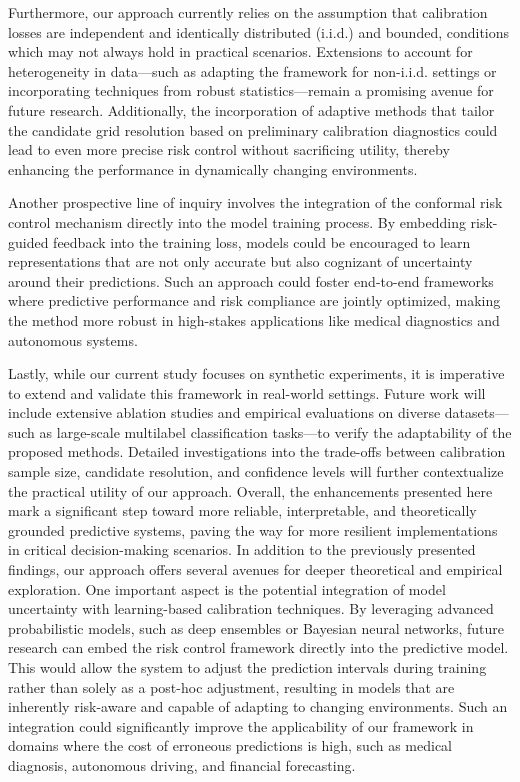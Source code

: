 \documentclass{article}
\begin{document}
Furthermore, our approach currently relies on the assumption that calibration losses are independent and identically distributed (i.i.d.) and bounded, conditions which may not always hold in practical scenarios. Extensions to account for heterogeneity in data—such as adapting the framework for non-i.i.d. settings or incorporating techniques from robust statistics—remain a promising avenue for future research. Additionally, the incorporation of adaptive methods that tailor the candidate grid resolution based on preliminary calibration diagnostics could lead to even more precise risk control without sacrificing utility, thereby enhancing the performance in dynamically changing environments.

Another prospective line of inquiry involves the integration of the conformal risk control mechanism directly into the model training process. By embedding risk-guided feedback into the training loss, models could be encouraged to learn representations that are not only accurate but also cognizant of uncertainty around their predictions. Such an approach could foster end-to-end frameworks where predictive performance and risk compliance are jointly optimized, making the method more robust in high-stakes applications like medical diagnostics and autonomous systems.

Lastly, while our current study focuses on synthetic experiments, it is imperative to extend and validate this framework in real-world settings. Future work will include extensive ablation studies and empirical evaluations on diverse datasets—such as large-scale multilabel classification tasks—to verify the adaptability of the proposed methods. Detailed investigations into the trade-offs between calibration sample size, candidate resolution, and confidence levels will further contextualize the practical utility of our approach. Overall, the enhancements presented here mark a significant step toward more reliable, interpretable, and theoretically grounded predictive systems, paving the way for more resilient implementations in critical decision-making scenarios.
In addition to the previously presented findings, our approach offers several avenues for deeper theoretical and empirical exploration. One important aspect is the potential integration of model uncertainty with learning-based calibration techniques. By leveraging advanced probabilistic models, such as deep ensembles or Bayesian neural networks, future research can embed the risk control framework directly into the predictive model. This would allow the system to adjust the prediction intervals during training rather than solely as a post-hoc adjustment, resulting in models that are inherently risk-aware and capable of adapting to changing environments. Such an integration could significantly improve the applicability of our framework in domains where the cost of erroneous predictions is high, such as medical diagnosis, autonomous driving, and financial forecasting.
\end{document}
